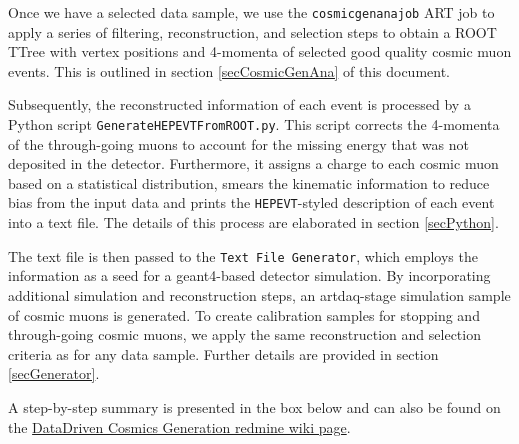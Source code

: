 \documentclass[12pt]{article}
\begin{document}
Once we have a selected data sample, we use the \texttt{cosmicgenanajob} ART job to apply a series of filtering, reconstruction, and selection steps to obtain a ROOT TTree with vertex positions and 4-momenta of selected good quality cosmic muon events. This is outlined in section \ref{secCosmicGenAna} of this document.

Subsequently, the reconstructed information of each event is processed by a Python script \texttt{GenerateHEPEVTFromROOT.py}. This script corrects the 4-momenta of the through-going muons to account for the missing energy that was not deposited in the detector. Furthermore, it assigns a charge to each cosmic muon based on a statistical distribution, smears the kinematic information to reduce bias from the input data and prints the \texttt{HEPEVT}-styled \cite{HEPEVTFormat} description of each event into a text file. The details of this process are elaborated in section \ref{secPython}.

The text file is then passed to the \texttt{Text File Generator}, which employs the information as a seed for a geant4-based \cite{GEANT4} detector simulation. By incorporating additional simulation and reconstruction steps, an artdaq-stage simulation sample of cosmic muons is generated. To create calibration samples for stopping and through-going cosmic muons, we apply the same reconstruction and selection criteria as for any data sample. Further details are provided in section \ref{secGenerator}. 

A step-by-step summary is presented in the box below and can also be found on the \href{https://cdcvs.fnal.gov/redmine/projects/novaart/wiki/DataDriven\_Cosmics}{DataDriven Cosmics Generation redmine wiki page}.
\end{document}
